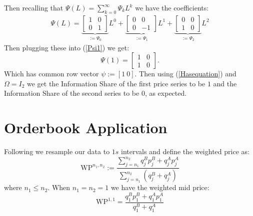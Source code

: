 \documentclass[a4paper, oneside, notitlepage]{book}
\begin{document}
Then recalling that $\Psi(L) = \sum_{k=0}^{\infty} \Psi_k L^k$ 
we have the coefficients:
\begin{align*}
    \Psi(L) =
\underbrace{
\begin{bmatrix}
1 & 0 \\
0 & 1
\end{bmatrix}
}_{:= \Psi_0} L^0
+
\underbrace{
\begin{bmatrix}
0 & 0 \\
0 & -1
\end{bmatrix}
}_{:= \Psi_1} L^1
+
\underbrace{
\begin{bmatrix}
0 & 0  \\
1 & 0
\end{bmatrix}
}_{:= \Psi_2}L^{2}
\end{align*}
Then plugging these into (\ref{Psi1}) we get:
\[
    \Psi(1) = \begin{bmatrix} 1 & 0 \\ 1 & 0 \end{bmatrix} 
.\]
Which has common row vector $\psi := [1 ~ 0]$. Then using (\ref{Hasequation})
and $\Omega = I_2$ we get the Information Share of the first price series to be $1$
and the Information Share of the second series to be $0$, as expected.

%
%
%
%
%
%
%
\section{Orderbook Application}

Following \cite{CAO2009} we resample our data to $1s$ intervals and define the weighted price as:
\begin{equation}
    \text{WP}^{n_{1}, n_{2}} := \frac{\sum_{j=n_{1}}^{n_{2}} q_{j}^B p_{j}^B + q_{j}^A p_{j}^A}{\sum_{j=n_{1}}^{n_{2}} (q^B_{j} + q^A_{j})}
\end{equation}
where $n_{1} \leq n_{2}$. When $n_{1} = n_{2} = 1$ we have the weighted mid price:
\begin{equation}
    \text{WP}^{1,1} = \frac{q_{1}^B p_{1}^B + q_{1}^A p_{1}^A}{q_{1}^B + q_{1}^A}
\end{equation}
\end{document}
